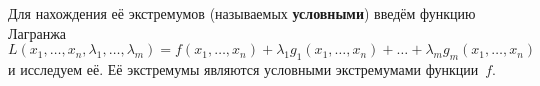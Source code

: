 Для нахождения её экстремумов (называемых \textbf{условными}) введём функцию Лагранжа
\begin{equation*}
L(x_1, \ldots, x_n, \lambda_1, \ldots, \lambda_m) =
f(x_1, \ldots, x_n) + \lambda_1 g_1(x_1, \ldots, x_n) + \ldots + \lambda_m g_m(x_1, \ldots, x_n)
\end{equation*}
и исследуем её.
Её экстремумы являются условными экстремумами функции~$f$.